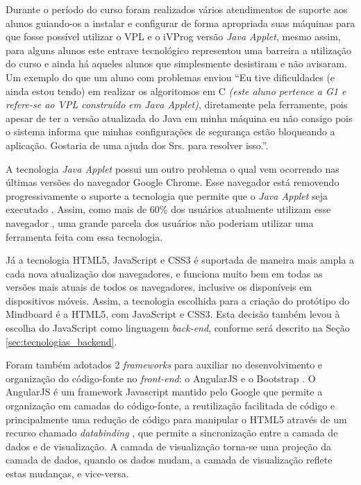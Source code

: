Durante o período do curso foram realizados vários atendimentos de suporte aos alunos guiando-os a instalar e configurar de forma apropriada suas máquinas para que fosse possível utilizar o VPL e o iVProg versão \emph{Java Applet}, mesmo assim, para alguns alunos este entrave tecnológico representou uma barreira a utilização do curso e ainda há aqueles alunos que simplesmente desistiram e não avisaram. Um exemplo do que um aluno com problemas enviou ``Eu tive dificuldades (e ainda estou tendo) em realizar os algoritomos em C \emph{(este aluno pertence a G1 e refere-se ao VPL construído em Java Applet)}, diretamente pela ferramente, pois apesar de ter a versão atualizada do Java em minha máquina eu não consigo pois o sistema informa que minhas configurações de segurança estão bloqueando a aplicação. Gostaria de uma ajuda dos Srs. para resolver isso.''. 

A tecnologia \emph{Java Applet} possui um outro problema o qual vem ocorrendo nas últimas versões do navegador Google Chrome. Esse navegador está removendo progressivamente o suporte a tecnologia que permite que o \emph{Java Applet} seja executado \cite{java_chrome}. Assim, como mais de 60\% dos usuários atualmente utilizam esse navegador \cite{browser_stats}, uma grande parcela dos usuários não poderiam utilizar uma ferramenta feita com essa tecnologia.

Já a tecnologia HTML5, JavaScript e CSS3 é suportada de maneira mais ampla a cada nova atualização dos navegadores, e funciona muito bem em todas as versões mais atuais de todos os navegadores, inclusive os disponíveis em dispositivos móveis. Assim, a tecnologia escolhida para a criação do protótipo do Mindboard é a HTML5, com JavaScript e CSS3. Esta decisão também levou à escolha do JavaScript como linguagem \emph{back-end}, conforme será descrito na Seção \ref{sec:tecnologias_backend}.

Foram também adotados 2 \emph{frameworks} para auxiliar no desenvolvimento e organização do código-fonte no \emph{front-end}: o AngularJS \cite{angularjs} e o Bootstrap \cite{bootstrap}. O AngularJS é um framework Javascript mantido pelo Google que permite a organização em camadas do código-fonte, a reutilização facilitada de código e principalmente uma redução de código para manipular o HTML5 através de um recurso chamado \emph{databinding} \cite{databinding}, que permite a sincronização entre a camada de dados e de visualização. A camada de visualização torna-se uma projeção da camada de dados, quando os dados mudam, a camada de visualização reflete estas mudanças, e vice-versa.

